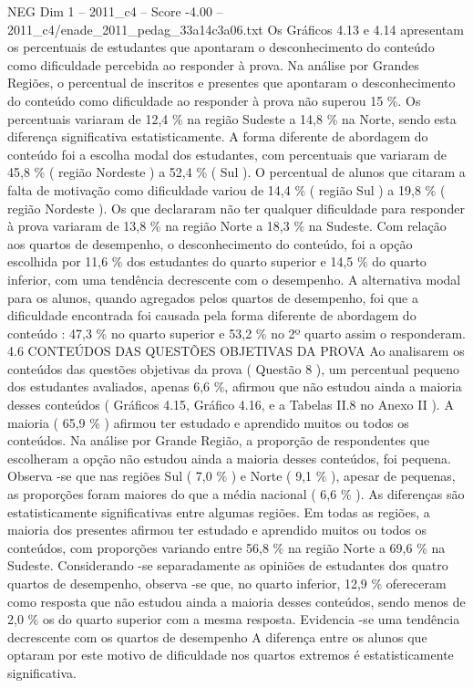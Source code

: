 \begin{textsample}{NEG Dim 1 – 2011\_c4 – Score -4.00 – 2011\_c4/enade\_2011\_pedag\_33a14c3a06.txt}
Os Gráficos 4.13 e 4.14 apresentam os percentuais de estudantes que apontaram o desconhecimento do conteúdo como dificuldade percebida ao responder à prova.
Na análise por Grandes Regiões, o percentual de inscritos e presentes que apontaram o desconhecimento do conteúdo como dificuldade ao responder à prova não superou 15 \%.
Os percentuais variaram de 12,4 \% na região Sudeste a 14,8 \% na Norte, sendo esta diferença significativa estatisticamente.
A forma diferente de abordagem do conteúdo foi a escolha modal dos estudantes, com percentuais que variaram de 45,8 \% ( região Nordeste ) a 52,4 \% ( Sul ).
O percentual de alunos que citaram a falta de motivação como dificuldade variou de 14,4 \% ( região Sul ) a 19,8 \% ( região Nordeste ).
Os que declararam não ter qualquer dificuldade para responder à prova variaram de 13,8 \% na região Norte a 18,3 \% na Sudeste.
Com relação aos quartos de desempenho, o desconhecimento do conteúdo, foi a opção escolhida por 11,6 \% dos estudantes do quarto superior e 14,5 \% do quarto inferior, com uma tendência decrescente com o desempenho.
A alternativa modal para os alunos, quando agregados pelos quartos de desempenho, foi que a dificuldade encontrada foi causada pela forma diferente de abordagem do conteúdo : 47,3 \% no quarto superior e 53,2 \% no 2º quarto assim o responderam. 4.6 CONTEÚDOS DAS QUESTÕES OBJETIVAS DA PROVA Ao analisarem os conteúdos das questões objetivas da prova ( Questão 8 ), um percentual pequeno dos estudantes avaliados, apenas 6,6 \%, afirmou que não estudou ainda a maioria desses conteúdos ( Gráficos 4.15, Gráfico 4.16, e a Tabelas II.8 no Anexo II ).
A maioria ( 65,9 \% ) afirmou ter estudado e aprendido muitos ou todos os conteúdos.
Na análise por Grande Região, a proporção de respondentes que escolheram a opção não estudou ainda a maioria desses conteúdos, foi pequena.
Observa -se que nas regiões Sul ( 7,0 \% ) e Norte ( 9,1 \% ), apesar de pequenas, as proporções foram maiores do que a média nacional ( 6,6 \% ).
As diferenças são estatisticamente significativas entre algumas regiões.
Em todas as regiões, a maioria dos presentes afirmou ter estudado e aprendido muitos ou todos os conteúdos, com proporções variando entre 56,8 \% na região Norte a 69,6 \% na Sudeste.
Considerando -se separadamente as opiniões de estudantes dos quatro quartos de desempenho, observa -se que, no quarto inferior, 12,9 \% ofereceram como resposta que não estudou ainda a maioria desses conteúdos, sendo menos de 2,0 \% os do quarto superior com a mesma resposta.
Evidencia -se uma tendência decrescente com os quartos de desempenho A diferença entre os alunos que optaram por este motivo de dificuldade nos quartos extremos é estatisticamente significativa.

\end{textsample}
